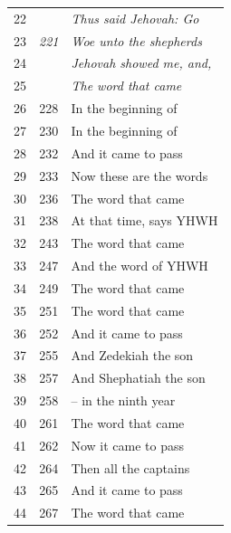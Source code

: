 \documentclass{article}
\newlength{\minipageheight}
\newlength{\minipagewidth}
\begin{document}
\begin{minipage}[r][\minipageheight][t]{\minipagewidth}
\begin{longtable}{ccl}
        22          &                & \textit{Thus said Jehovah: Go}      \\
        23          & \textit{221}   & \textit{Woe unto the shepherds}     \\
        24          &                & \textit{Jehovah showed me, and,}    \\
        25          &                & \textit{The word that came}         \\
        26          & 228            & In the beginning of                 \\
        27          & 230            & In the beginning of                 \\
        28          & 232            & And it came to pass                 \\
        29          & 233            & Now these are the words             \\
        30          & 236            & The word that came                  \\
        31          & 238 \cancel{¶} & At that time, says YHWH             \\
        32          & 243            & The word that came                  \\
        33          & 247            & And the word of YHWH                \\
        34          & 249            & The word that came                  \\
        35          & 251            & The word that came                  \\
        36          & 252            & And it came to pass                 \\
        37          & 255            & And Zedekiah the son                \\
        38          & 257            & And Shephatiah the son              \\
        39          & 258 \cancel{¶} & -- in the ninth year                \\
        40          & 261            & The word that came                  \\
        41          & 262            & Now it came to pass                 \\
        42          & 264            & Then all the captains               \\
        43          & 265            & And it came to pass                 \\
        44          & 267            & The word that came                  \\

\end{longtable}
\end{minipage}
\end{document}
